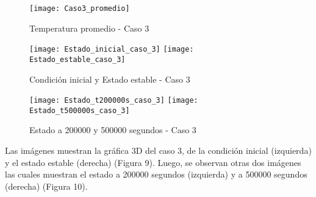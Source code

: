 \documentclass{article}
\begin{document}
\begin{figure}[h!]
\centering
\texttt{[image: Caso3\_promedio]}
\caption{Temperatura promedio - Caso 3}
\label{temp3}
\end{figure}


\begin{figure}[h!]
\centering
\texttt{[image: Estado\_inicial\_caso\_3]}
\texttt{[image: Estado\_estable\_caso\_3]}
\caption{Condición inicial y Estado estable - Caso 3}
\label{cond3}
\end{figure}

\begin{figure}[h!]
\centering
\texttt{[image: Estado\_t200000s\_caso\_3]}
\texttt{[image: Estado\_t500000s\_caso\_3]}
\caption{Estado a 200000 y 500000 segundos - Caso 3}
\label{Est3}
\end{figure}


\vspace{3mm}
Las imágenes muestran la gráfica 3D del caso 3, de la condición inicial (izquierda) y el estado estable (derecha) (Figura 9). Luego, se observan otras dos imágenes las cuales muestran el estado a 200000 segundos (izquierda) y a 500000 segundos (derecha) (Figura 10).
\end{document}
